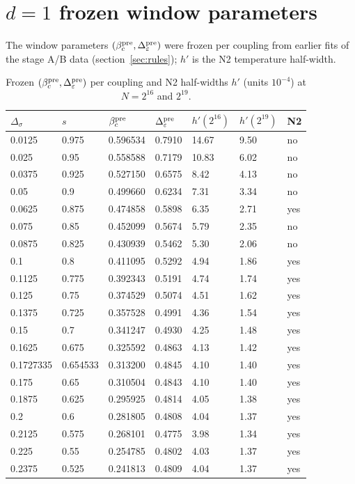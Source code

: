 \documentclass[10pt,a4paper]{article}
\newcommand{\Ds}{\Delta_\sigma}
\newcommand{\De}{\Delta_\varepsilon}
\begin{document}
\appendix
\section{\texorpdfstring{$d=1$ frozen window parameters}{d=1 frozen window parameters}}\label{app:pre}
The window parameters $(\beta_c^{\rm pre},\De^{\rm pre})$ were frozen per coupling from earlier fits of the stage A/B data
(section~\ref{sec:rules}); $h'$ is the N2 temperature half-width.
\begin{table}[htbp]\centering\small
\caption{Frozen $(\beta_c^{\rm pre},\De^{\rm pre})$ per coupling and N2 half-widths $h'$ (units $10^{-4}$) at $N=2^{16}$ and $2^{19}$.}
\begin{tabular}{@{}lllllll@{}}\toprule
$\Ds$ & $s$ & $\beta_c^{\rm pre}$ & $\De^{\rm pre}$ & $h'(2^{16})$ & $h'(2^{19})$ & N2 \\\midrule
0.0125 & 0.975 & 0.596534 & 0.7910 & 14.67 & 9.50 & no \\
0.025 & 0.95 & 0.558588 & 0.7179 & 10.83 & 6.02 & no \\
0.0375 & 0.925 & 0.527150 & 0.6575 & 8.42 & 4.13 & no \\
0.05 & 0.9 & 0.499660 & 0.6234 & 7.31 & 3.34 & no \\
0.0625 & 0.875 & 0.474858 & 0.5898 & 6.35 & 2.71 & yes \\
0.075 & 0.85 & 0.452099 & 0.5674 & 5.79 & 2.35 & no \\
0.0875 & 0.825 & 0.430939 & 0.5462 & 5.30 & 2.06 & no \\
0.1 & 0.8 & 0.411095 & 0.5292 & 4.94 & 1.86 & yes \\
0.1125 & 0.775 & 0.392343 & 0.5191 & 4.74 & 1.74 & yes \\
0.125 & 0.75 & 0.374529 & 0.5074 & 4.51 & 1.62 & yes \\
0.1375 & 0.725 & 0.357528 & 0.4991 & 4.36 & 1.54 & yes \\
0.15 & 0.7 & 0.341247 & 0.4930 & 4.25 & 1.48 & yes \\
0.1625 & 0.675 & 0.325592 & 0.4863 & 4.13 & 1.42 & yes \\
0.1727335 & 0.654533 & 0.313200 & 0.4845 & 4.10 & 1.40 & yes \\
0.175 & 0.65 & 0.310504 & 0.4843 & 4.10 & 1.40 & yes \\
0.1875 & 0.625 & 0.295925 & 0.4814 & 4.05 & 1.38 & yes \\
0.2 & 0.6 & 0.281805 & 0.4808 & 4.04 & 1.37 & yes \\
0.2125 & 0.575 & 0.268101 & 0.4775 & 3.98 & 1.34 & yes \\
0.225 & 0.55 & 0.254785 & 0.4802 & 4.03 & 1.37 & yes \\
0.2375 & 0.525 & 0.241813 & 0.4809 & 4.04 & 1.37 & yes \\
\bottomrule\end{tabular}
\end{table}
\end{document}
